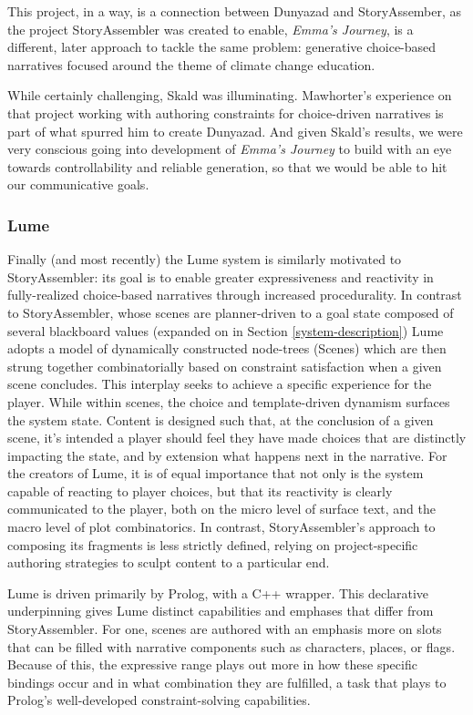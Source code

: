 This project, in a way, is a connection between Dunyazad and StoryAssember, as the project StoryAssembler was created to enable, \textit{Emma's Journey}, is a different, later approach to tackle the same problem: generative choice-based narratives focused around the theme of climate change education.

While certainly challenging, Skald was illuminating. Mawhorter's experience on that project working with authoring constraints for choice-driven narratives is part of what spurred him to create Dunyazad. And given Skald's results, we were very conscious going into development of \textit{Emma's Journey} to build with an eye towards controllability and reliable generation, so that we would be able to hit our communicative goals.

\subsubsection{Lume}

Finally (and most recently) the Lume system \cite{mason2019lume} is similarly motivated to StoryAssembler: its goal is to enable greater expressiveness and reactivity in fully-realized choice-based narratives through increased procedurality. In contrast to StoryAssembler, whose scenes are planner-driven to a goal state composed of several blackboard values (expanded on in Section \ref{system-description}) Lume adopts a model of dynamically constructed node-trees (Scenes) which are then strung together combinatorially based on constraint satisfaction when a given scene concludes. This interplay seeks to achieve a specific experience for the player. While within scenes, the choice and template-driven dynamism surfaces the system state. Content is designed such that, at the conclusion of a given scene, it's intended a player should feel they have made choices that are distinctly impacting the state, and by extension what happens next in the narrative. For the creators of Lume, it is of equal importance that not only is the system capable of reacting to player choices, but that its reactivity is clearly communicated to the player, both on the micro level of surface text, and the macro level of plot combinatorics. In contrast, StoryAssembler's approach to composing its fragments is less strictly defined, relying on project-specific authoring strategies to sculpt content to a particular end.

Lume is driven primarily by Prolog, with a C++ wrapper. This declarative underpinning gives Lume distinct capabilities and emphases that differ from StoryAssembler. For one, scenes are authored with an emphasis more on slots that can be filled with narrative components such as characters, places, or flags. Because of this, the expressive range plays out more in how these specific bindings occur and in what combination they are fulfilled, a task that plays to Prolog's well-developed constraint-solving capabilities.

